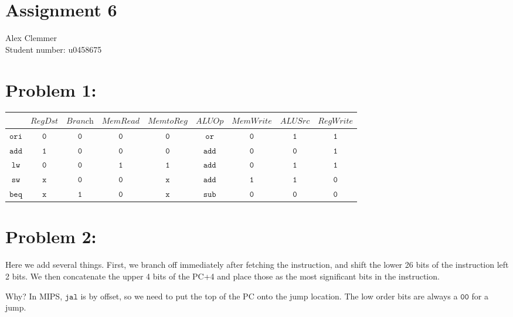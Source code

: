 \documentclass[a4paper]{article}
\begin{document}
\section*{Assignment 6 }
Alex Clemmer\\
Student number: u0458675

\section{Problem 1:}

\begin{center}
\begin{tabular}{|c|c|c|c|c|c|c|c|c|}
\hline
& $\textit{RegDst}$ & $\textit{Branch}$ & $\textit{MemRead}$ & $\textit{MemtoReg}$ & $\textit{ALUOp}$ & $\textit{MemWrite}$ & $\textit{ALUSrc}$ & $\textit{RegWrite}$  \\
\hline
\hline
$\texttt{ori}$ & $\texttt{0}$ & $\texttt{0}$ & $\texttt{0}$ & $\texttt{0}$ & $\texttt{or}$ & $\texttt{0}$ & $\texttt{1}$ & $\texttt{1}$ \\
\hline
$\texttt{add}$ & $\texttt{1}$ & $\texttt{0}$ & $\texttt{0}$ & $\texttt{0}$ & $\texttt{add}$ & $\texttt{0}$ & $\texttt{0}$ & $\texttt{1}$ \\
\hline
$\texttt{lw}$ & $\texttt{0}$ & $\texttt{0}$ & $\texttt{1}$ & $\texttt{1}$ & $\texttt{add}$ & $\texttt{0}$ & $\texttt{1}$ & $\texttt{1}$ \\
\hline
$\texttt{sw}$ & $\texttt{x}$ & $\texttt{0}$ & $\texttt{0}$ & $\texttt{x}$ & $\texttt{add}$ & $\texttt{1}$ & $\texttt{1}$ & $\texttt{0}$ \\
\hline
$\texttt{beq}$  & $\texttt{x}$ & $\texttt{1}$ & $\texttt{0}$ & $\texttt{x}$ & $\texttt{sub}$ & $\texttt{0}$ & $\texttt{0}$ & $\texttt{0}$ \\
\hline
\end{tabular}
\end{center}

\section{Problem 2:}

Here we add several things. First, we branch off immediately after fetching the instruction, and shift the lower 26 bits of the instruction left 2 bits. We then concatenate the upper 4 bits of the PC+4 and place those as the most significant bits in the instruction.

Why? In MIPS, $\texttt{jal}$ is by offset, so we need to put the top of the PC onto the jump location. The low order bits are always a $\texttt{00}$ for a jump.
\end{document}

